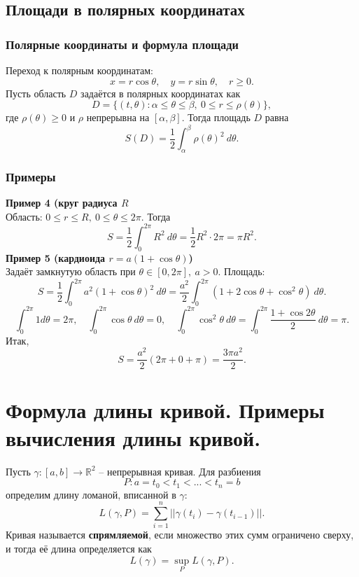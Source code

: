 \documentclass[14pt]{extreport}
\begin{document}
    \section{Площади в полярных координатах}
    \subsection{Полярные координаты и формула площади}
    Переход к полярным координатам:
    \[
    x = r\cos \theta, \quad y = r\sin \theta, \quad r \geq 0.
    \]
    Пусть область $D$ задаётся в полярных координатах как
    \[
    D = \{ (t,\theta): \alpha \leq \theta \leq \beta,\ 0 \leq r \leq \rho(\theta) \},
    \]
    где $\rho(\theta) \geq 0$ и $\rho$ непрерывна на $[\alpha, \beta]$. Тогда площадь $D$ равна
    \[
    S(D) = \frac{1}{2} \int_\alpha^\beta \rho(\theta)^2\ d\theta.
    \]

    \subsection{Примеры}
    \textbf{Пример 4 (круг радиуса $R$}\\
    Область: $0 \leq r \leq R,\ 0 \leq \theta \leq 2\pi$. Тогда
    \[
    S = \frac{1}{2} \int_0^{2\pi} R^2\ d\theta = \frac{1}{2}R^2 \cdot 2\pi = \pi R^2.
    \]
    \textbf{Пример 5 (кардиоида $r = a(1+\cos \theta)$)}\\
    Задаёт замкнутую область при $\theta \in [0,2\pi],\ a > 0$. Площадь:
    \[
    S = \frac{1}{2} \int_0^{2\pi} a^2(1+\cos \theta)^2\ d\theta = \frac{a^2}{2} \int_0^{2\pi} (1 + 2\cos \theta + \cos^2 \theta)\ d\theta.
    \]
    \[
    \int_0^{2\pi} 1d\theta = 2\pi, \quad \int_0^{2\pi} \cos \theta\ d\theta = 0, \quad \int_0^{2\pi} \cos^2 \theta\ d\theta = \int_0^{2\pi} \frac{1 + \cos 2\theta}{2}\ d\theta = \pi.
    \]
    Итак,
    \[
    S = \frac{a^2}{2} (2\pi + 0 + \pi) = \frac{3\pi a^2}{2}.
    \]



    \chapter{Формула длины кривой. Примеры вычисления длины кривой.}

    \begin{definition}
        Пусть $\gamma: [a,b] \rightarrow \mathbb{R}^2$ – непрерывная кривая. Для разбиения
        \[
        P: a = t_0 < t_1 < ... < t_n = b
        \]
        определим длину ломаной, вписанной в $\gamma$:
        \[
        L(\gamma,P) = \sum_{i=1}^n ||\gamma(t_i) - \gamma(t_{i-1})||.
        \]
        Кривая называется \textbf{спрямляемой}, если множество этих сумм ограничено сверху, и тогда её длина определяется как
        \[
        L(\gamma) = \sup_P L(\gamma,P).
        \]
    \end{definition}
\end{document}
